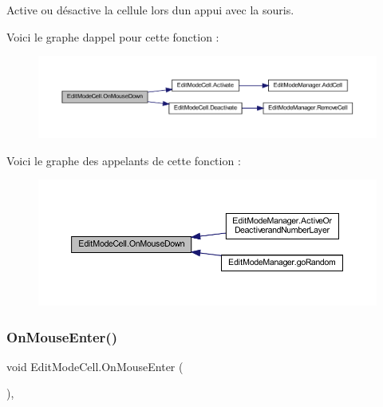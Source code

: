 Active ou désactive la cellule lors d\textquotesingle{}un appui avec la souris. 

Voici le graphe d\textquotesingle{}appel pour cette fonction \+:
\nopagebreak
\begin{figure}[H]
\begin{center}
\leavevmode
\includegraphics[width=350pt]{class_edit_mode_cell_a692f6272d4ef7a51092aef52a599233d_cgraph}
\end{center}
\end{figure}
Voici le graphe des appelants de cette fonction \+:
\nopagebreak
\begin{figure}[H]
\begin{center}
\leavevmode
\includegraphics[width=350pt]{class_edit_mode_cell_a692f6272d4ef7a51092aef52a599233d_icgraph}
\end{center}
\end{figure}
\mbox{\label{class_edit_mode_cell_ac6101c61c85633c91eee689ebc72536f}} 
\subsubsection{\texorpdfstring{On\+Mouse\+Enter()}{OnMouseEnter()}}
{\footnotesize\ttfamily void Edit\+Mode\+Cell.\+On\+Mouse\+Enter (\begin{DoxyParamCaption}{ }\end{DoxyParamCaption})\hspace{0.3cm}{\ttfamily [inline]}, {\ttfamily [private]}}



